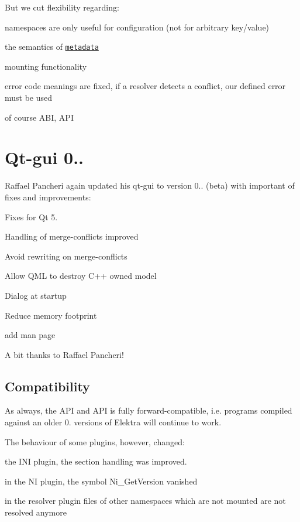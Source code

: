 But we cut flexibility regarding\+:


\begin{DoxyItemize}
\item namespaces are only useful for configuration (not for arbitrary key/value)
\item the semantics of \href{http://git.libelektra.org/blob/master/doc/METADATA.ini}{\tt metadata}
\item mounting functionality
\item error code meanings are fixed, if a resolver detects a conflict, our defined error must be used
\item of course A\+B\+I, A\+P\+I
\end{DoxyItemize}

\section*{Qt-\/gui 0..}

Raffael Pancheri again updated his qt-\/gui to version 0.. (beta) with important of fixes and improvements\+:


\begin{DoxyItemize}
\item Fixes for Qt 5.
\item Handling of merge-\/conflicts improved
\item Avoid rewriting on merge-\/conflicts
\item Allow Q\+M\+L to destroy C++ owned model
\item Dialog at startup
\item Reduce memory footprint
\item add man page
\end{DoxyItemize}

A bit thanks to Raffael Pancheri!

\subsection*{Compatibility}

As always, the A\+P\+I and A\+P\+I is fully forward-\/compatible, i.\+e. programs compiled against an older 0. versions of Elektra will continue to work.

The behaviour of some plugins, however, changed\+:


\begin{DoxyItemize}
\item the I\+N\+I plugin, the section handling was improved.
\item in the N\+I plugin, the symbol Ni\+\_\+\+Get\+Version vanished
\item in the resolver plugin files of other namespaces which are not mounted are not resolved anymore
\end{DoxyItemize}

